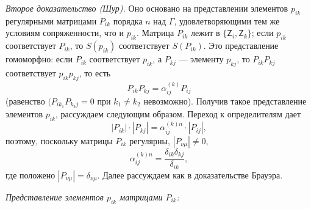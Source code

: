 \documentclass[11pt]{article}
\begin{document}
\emph{Второе доказательство (Шур).} Оно основано на представлении элементов \(p_{ik}\) регулярными матрицами \(P_{ik}\) порядка \(n\) над \(\Gamma\), удовлетворяющими тем же условиям сопряженности, что и \(p_{ik}\). Матрица \(P_{ik}\) лежит в \(\{\mathsf{Z}_i,\mathsf{Z}_k\}\); если \(p_{ik}\) соответствует \(P_{ik}\), то \(S(p_{ik})\) соответствует \(S(P_{ik})\). Это представление гомоморфно: если \(P_{ik}\) соответствует \(p_{ik}\), а \(P_{kj}\) --- элементу \(p_{kj}\), то \(P_{ik}P_{kj}\) соответствует \(p_{ik}p_{kj}\), то есть
\[
P_{ik}P_{kj}=\alpha_{ij}^{(k)}P_{ij}
\]
(равенство \((P_{ik_1}P_{k_2j}=0\) при \(k_1\neq k_2\) невозможно). Получив такое представление элементов \(p_{ik}\), рассуждаем следующим образом. Переход к определителям дает
\[
|P_{ik}|\cdot |P_{kj}|=\alpha_{ij}^{(k)n}\cdot |P_{ij}|,
\]
поэтому, поскольку матрицы \(P_{ik}\) регулярны, \(|P_{\nu\mu}|\ne0\),
\[
\alpha_{ij}^{(k)n}=\frac{\delta_{ik}\delta_{kj}}{\delta_{ik}},
\]
где положено \(|P_{\nu\mu}|=\delta_{\nu\mu}\). Далее рассуждаем как в доказательстве Брауэра.

\emph{Представление элементов \(p_{ik}\) матрицами \(P_{ik}\):}
\end{document}
